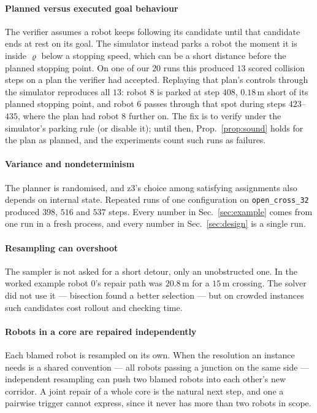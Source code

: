 \documentclass[conference]{IEEEtran}
\theoremstyle{plain}
\theoremstyle{definition}
\begin{document}
\paragraph*{Planned versus executed goal behaviour}
The verifier assumes a robot keeps following its candidate until that candidate ends at rest
on its goal. The simulator instead parks a robot the moment it is inside $\varrho$ below a
stopping speed, which can be a short distance before the planned stopping point. On one of our
$20$ runs this produced $13$ scored collision steps on a plan the verifier had accepted.
Replaying that plan's controls through the simulator reproduces all $13$: robot $8$ is parked at
step $408$, $0.18$\,m short of its planned stopping point, and robot $6$ passes through that
spot during steps $423$--$435$, where the plan had robot $8$ further on. The fix is to verify
under the simulator's parking rule (or disable it); until then,
Prop.~\ref{prop:sound} holds for the plan as planned, and the experiments count such runs as
failures.

\paragraph*{Variance and nondeterminism}
The planner is randomised, and z3's choice among satisfying assignments also depends on
internal state. Repeated runs of one configuration on \texttt{open\_cross\_32} produced $398$,
$516$ and $537$ steps. Every number in Sec.~\ref{sec:example} comes from one run in a fresh
process, and every number in Sec.~\ref{sec:design} is a single run.

\paragraph*{Resampling can overshoot}
The sampler is not asked for a short detour, only an unobstructed one. In the worked example
robot $0$'s repair path was $20.8$\,m for a $15$\,m crossing. The solver did not use it ---
bisection found a better selection --- but on crowded instances such candidates cost rollout
and checking time.

\paragraph*{Robots in a core are repaired independently}
Each blamed robot is resampled on its own. When the resolution an instance needs is a shared
convention --- all robots passing a junction on the same side --- independent resampling can push
two blamed robots into each other's new corridor. A joint repair of a whole core is the natural
next step, and one a pairwise trigger cannot express, since it never has more than two robots in
scope.
\end{document}
